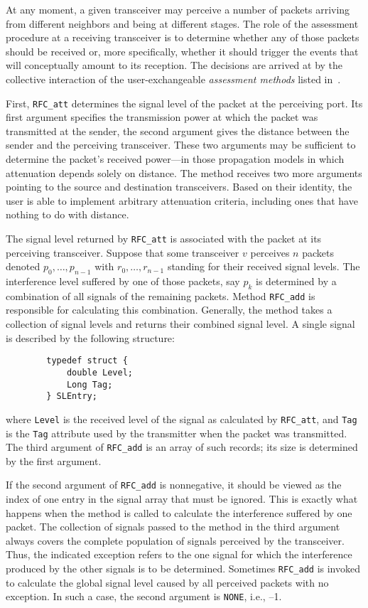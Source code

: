 At any moment, a given transceiver may perceive a number of packets arriving
from different neighbors and being at different stages.
The role of the assessment procedure at a receiving transceiver is to
determine whether any of those packets should be received or, more
specifically, whether it should trigger the events that will conceptually
amount to its reception.
The decisions are arrived at by the collective interaction of the
user-exchangeable {\em assessment methods\/} listed in~.

First, {\tt RFC\_att} determines the signal level of the packet at the
perceiving port.
Its first argument specifies the transmission power at which
the packet was transmitted at the sender,
the second argument gives the distance between
the sender and the perceiving transceiver.
These two arguments may be sufficient to determine the packet's received
power---in those propagation models in which attenuation depends solely on
distance.
The method receives two more arguments pointing to the source and destination
transceivers.
Based on their identity, the user is able to implement arbitrary attenuation
criteria, including ones that have nothing to do with distance.

The signal level returned by {\tt RFC\_att} is associated with the packet
at its perceiving transceiver.
Suppose that some transceiver $v$ perceives $n$ packets denoted
$p_0, \ldots , p_{n-1}$ with $r_0, \ldots , r_{n-1}$ standing for their
received signal levels.
The interference level suffered by one of those packets,
say $p_k$ is determined by 
a combination of all signals of the remaining packets.
Method {\tt RFC\_add} is responsible for calculating this combination.
Generally, the method takes a collection of signal levels and returns
their combined signal level.
A single signal is described by the following structure:
\begin{verbatim}
        typedef struct {
            double Level;
            Long Tag;
        } SLEntry;
\end{verbatim}
\noindent
where {\tt Level} is the received level of the signal as calculated by
{\tt RFC\_att}, and {\tt Tag} is the {\tt Tag} attribute used by
the transmitter when the packet was transmitted.
The third argument of {\tt RFC\_add} is an array of such records; its size
is determined by the first argument.

If the second argument of {\tt RFC\_add} is nonnegative, it should be viewed
as the index of one entry in the signal array that must be ignored.
This is exactly what happens when the method is called to calculate the
interference suffered by one packet.
The collection of signals passed to the method in the third argument always
covers the complete population of signals perceived by the transceiver.
Thus, the indicated exception refers to the one signal for which the
interference produced by the other signals is to be determined.
Sometimes {\tt RFC\_add} is invoked to calculate the global signal level
caused by all perceived packets with no exception.
In such a case, the second argument is {\tt NONE}, i.e., --1.

